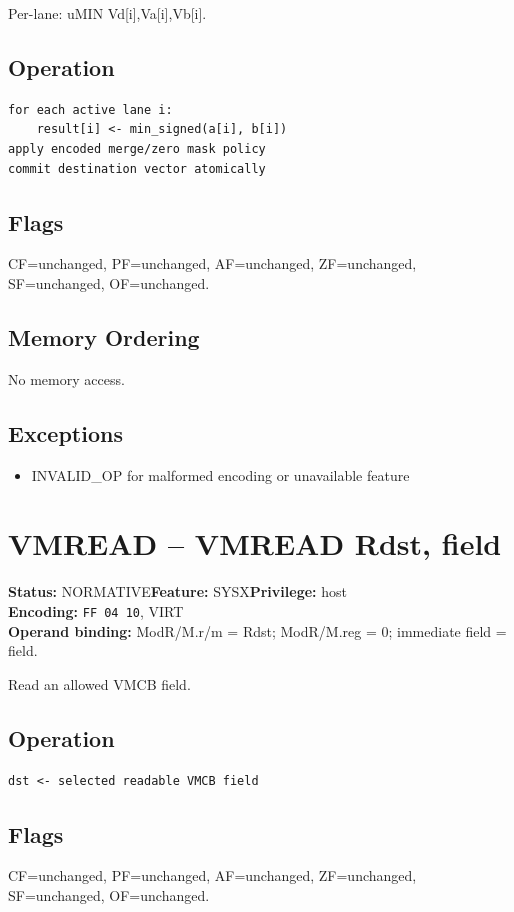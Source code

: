 \documentclass[10pt]{article}
\begin{document}
Per-lane: uMIN Vd[i],Va[i],Vb[i].

\subsection*{Operation}
\begin{lstlisting}
for each active lane i:
    result[i] <- min_signed(a[i], b[i])
apply encoded merge/zero mask policy
commit destination vector atomically
\end{lstlisting}
\subsection*{Flags}
CF=unchanged, PF=unchanged, AF=unchanged, ZF=unchanged, SF=unchanged, OF=unchanged.
\subsection*{Memory Ordering}
No memory access.
\subsection*{Exceptions}
\begin{itemize}
\item INVALID\_OP for malformed encoding or unavailable feature
\end{itemize}
\clearpage

\section{VMREAD -- VMREAD Rdst, field}
\textbf{Status:} NORMATIVE\quad \textbf{Feature:} SYSX\quad \textbf{Privilege:} host\\
\textbf{Encoding:} \texttt{FF 04 10}, VIRT\\
\textbf{Operand binding:} ModR/M.r/m = Rdst; ModR/M.reg = 0; immediate field = field.

Read an allowed VMCB field.

\subsection*{Operation}
\begin{lstlisting}
dst <- selected readable VMCB field
\end{lstlisting}
\subsection*{Flags}
CF=unchanged, PF=unchanged, AF=unchanged, ZF=unchanged, SF=unchanged, OF=unchanged.
\end{document}
